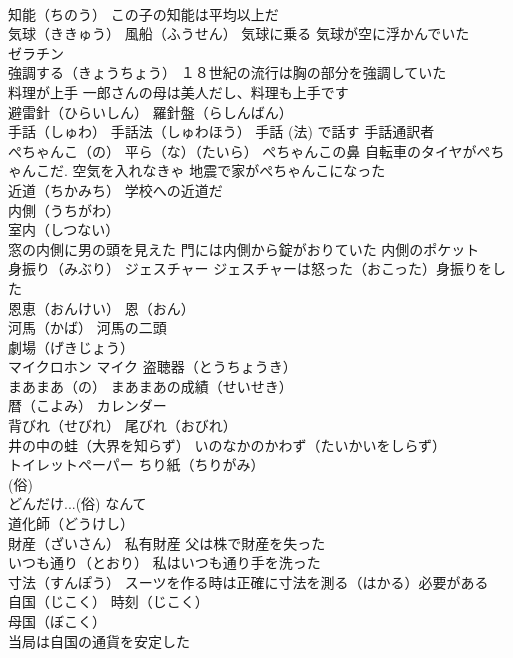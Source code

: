 \documentclass[8pt]{extreport}
\begin{document}
\begin{CJK}{UTF8}{min}
\\	知能（ちのう） この子の知能は平均以上だ
\\	気球（ききゅう） 風船（ふうせん） 気球に乗る 気球が空に浮かんでいた
\\	ゼラチン
\\	強調する（きょうちょう） １８世紀の流行は胸の部分を強調していた
\\	料理が上手 一郎さんの母は美人だし、料理も上手です
\\	避雷針（ひらいしん） 羅針盤（らしんばん）
\\	手話（しゅわ） 手話法（しゅわほう） 手話 (法) で話す 手話通訳者
\\	ぺちゃんこ（の） 平ら（な）（たいら） ぺちゃんこの鼻 自転車のタイヤがぺちゃんこだ. 空気を入れなきゃ 地震で家がぺちゃんこになった
\\	近道（ちかみち） 学校への近道だ
\\	内側（うちがわ）
\\	室内（しつない）
\\	窓の内側に男の頭を見えた 門には内側から錠がおりていた 内側のポケット
\\	身振り（みぶり） ジェスチャー ジェスチャーは怒った（おこった）身振りをした
\\	恩恵（おんけい） 恩（おん）
\\	河馬（かば） 河馬の二頭
\\	劇場（げきじょう）
\\	マイクロホン マイク 盗聴器（とうちょうき）
\\	まあまあ（の） まあまあの成績（せいせき）
\\	暦（こよみ） カレンダー
\\	背びれ（せびれ） 尾びれ（おびれ）
\\	井の中の蛙（大界を知らず） いのなかのかわず（たいかいをしらず）
\\	トイレットペーパー ちり紙（ちりがみ） 
\\	(俗) 
\\	どんだけ...(俗) なんて
\\	道化師（どうけし）
\\	財産（ざいさん） 私有財産 父は株で財産を失った
\\	いつも通り（とおり） 私はいつも通り手を洗った
\\	寸法（すんぽう） スーツを作る時は正確に寸法を測る（はかる）必要がある
\\	自国（じこく） 時刻（じこく）
\\	母国（ぼこく）
\\	当局は自国の通貨を安定した

\end{CJK}
\end{document}
